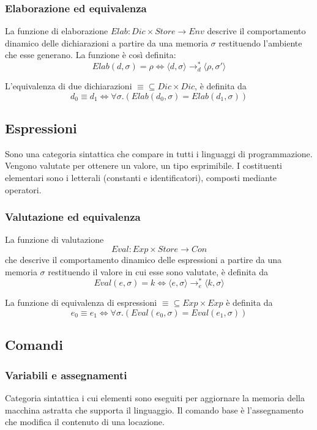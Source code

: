 \documentclass{article}[10pt]
\begin{document}
	\subsubsection{Elaborazione ed equivalenza}
	La funzione di elaborazione $Elab:Dic \times Store \to Env$ descrive il comportamento dinamico delle dichiarazioni a partire da una memoria $\sigma$ restituendo l'ambiente che esse generano. La funzione è così definita:
	$$Elab(d, \sigma)=\rho \iff \langle d,\sigma \rangle \to_d^* \langle \rho, \sigma' \rangle$$
	
	L'equivalenza di due dichiarazioni $\equiv \subseteq Dic \times Dic$, è definita da $$d_0 \equiv d_1 \iff \forall \sigma.(Elab(d_0,\sigma) = Elab(d_1, \sigma))$$
	
	\subsection{Espressioni}
	Sono una categoria sintattica che compare in tutti i linguaggi di programmazione. Vengono valutate per ottenere un valore, un tipo esprimibile. I costituenti elementari sono i letterali (constanti e identificatori), composti mediante operatori.
	
	\subsubsection{Valutazione ed equivalenza}
	La funzione di valutazione $$Eval:Exp \times Store \to Con$$
	che descrive il comportamento dinamico delle espressioni a partire da una memoria $\sigma$ restituendo il valore in cui esse sono valutate, è definita da $$Eval(e, \sigma)=k \iff \langle e, \sigma \rangle \to_e^* \langle k, \sigma \rangle$$
	
	La funzione di equivalenza di espressioni $\equiv \subseteq Exp \times Exp$ è definita da $$e_0 \equiv e_1 \iff \forall \sigma.(Eval(e_0,\sigma)=Eval(e_1, \sigma))$$
	
	\subsection{Comandi}
	\subsubsection{Variabili e assegnamenti}
	Categoria sintattica i cui elementi sono eseguiti per aggiornare la memoria della macchina astratta che supporta il linguaggio. Il comando base è l'assegnamento che modifica il contenuto di una locazione. \\
	
\end{document}

